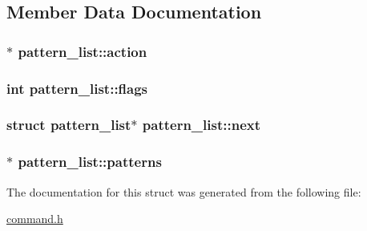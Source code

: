 \subsection{Member Data Documentation}
\subsubsection[{\texorpdfstring{action}{action}}]{$\ast$ pattern\+\_\+list\+::action}\hypertarget{structpattern__list_ae31932a25ce2a1a616aecae649f78045}{}\label{structpattern__list_ae31932a25ce2a1a616aecae649f78045}
\subsubsection[{\texorpdfstring{flags}{flags}}]{\setlength{\rightskip}{0pt plus 5cm}int pattern\+\_\+list\+::flags}\hypertarget{structpattern__list_abae207e9054326f960ead31780ccf5ea}{}\label{structpattern__list_abae207e9054326f960ead31780ccf5ea}
\subsubsection[{\texorpdfstring{next}{next}}]{\setlength{\rightskip}{0pt plus 5cm}struct {\bf pattern\+\_\+list}$\ast$ pattern\+\_\+list\+::next}\hypertarget{structpattern__list_a298ee7f13c0ded6032300588bc4739c6}{}\label{structpattern__list_a298ee7f13c0ded6032300588bc4739c6}
\subsubsection[{\texorpdfstring{patterns}{patterns}}]{$\ast$ pattern\+\_\+list\+::patterns}\hypertarget{structpattern__list_a434e80f6704633cfb08dab20c1d28076}{}\label{structpattern__list_a434e80f6704633cfb08dab20c1d28076}


The documentation for this struct was generated from the following file\+:\begin{DoxyCompactItemize}
\item 
\hyperlink{command_8h}{command.\+h}\end{DoxyCompactItemize}
